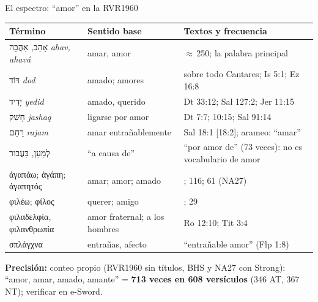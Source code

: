 \documentclass[hyperref={bookmarks=false},aspectratio=169]{beamer}
\newcommand{\heb}[1]{\mbox{\foreignlanguage{hebrew}{#1}}}
\newcommand{\grc}[1]{\foreignlanguage{ancientgreek}{#1}}
\newcommand{\precision}[1]{{\footnotesize\color{gris}\textbf{Precisión:} #1}}
\begin{document}
\begin{frame}{El espectro: ``amor'' en la RVR1960}
\scriptsize\renewcommand{\arraystretch}{1.05}
\begin{tabular}{@{}>{\RaggedRight\arraybackslash}p{3.3cm}>{\RaggedRight\arraybackslash}p{3.4cm}>{\RaggedRight\arraybackslash}p{5.3cm}@{}}
\toprule
\textbf{Término} & \textbf{Sentido base} & \textbf{Textos y frecuencia} \\ \midrule
\heb{אָהַב}, \heb{אַהֲבָה} \emph{ahav, ahavá} & amar, amor & $\approx$\,250; la palabra principal \\
\heb{דּוֹד} \emph{dod} & amado; amores & sobre todo Cantares; Is 5:1; Ez 16:8 \\
\heb{יָדִיד} \emph{yedid} & amado, querido & Dt 33:12; Sal 127:2; Jer 11:15 \\
\heb{חָשַׁק} \emph{jashaq} & ligarse por amor & Dt 7:7; 10:15; Sal 91:14 \\
\heb{רָחַם} \emph{rajam} & amar entrañablemente & Sal 18:1 [18:2]; arameo: ``amar'' \\
\heb{לְמַעַן}, \heb{בַּעֲבוּר} & ``a causa de'' & ``por amor de'' (73 veces): no es vocabulario de amor \\ \midrule
\grc{ἀγαπάω}; \grc{ἀγάπη}; \grc{ἀγαπητός} & amar; amor; amado & 143; 116; 61 (NA27) \\
\grc{φιλέω}; \grc{φίλος} & querer; amigo & 25; 29 \\
\grc{φιλαδελφία}, \grc{φιλανθρωπία} & amor fraternal; a los hombres & Ro 12:10; Tit 3:4 \\
\grc{σπλάγχνα} & entrañas, afecto & ``entrañable amor'' (Flp 1:8) \\
\bottomrule
\end{tabular}\par\smallskip
\precision{conteo propio (RVR1960 sin títulos, BHS y NA27 con Strong): ``amor, amar, amado, amante'' = \textbf{713 veces en 608 versículos} (346 AT, 367 NT); verificar en e-Sword.}
\end{frame}
\end{document}
